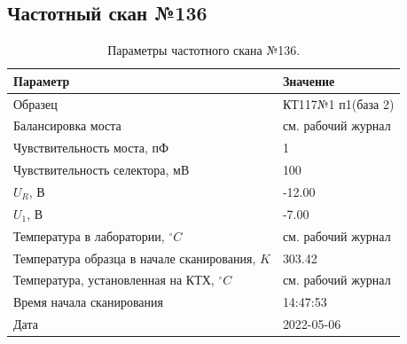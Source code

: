 \subsection{Частотный скан №136}
\begin{table}[!ht]
    \centering
    \caption{Параметры частотного скана №136.}
    \begin{tabular}{|l|l|}
        \hline
        Параметр                                       & Значение                  \\ \hline
        Образец                                        & КТ117№1 п1(база 2)        \\ \hline
        Балансировка моста                             & см. рабочий журнал        \\ \hline
        Чувствительность моста, пФ                     & 1                         \\ \hline
        Чувствительность селектора, мВ                 & 100                       \\ \hline
        $U_R$, В                                       & -12.00                    \\ \hline
        $U_1$, В                                       & -7.00                     \\ \hline
        Температура в лаборатории, $^\circ C$          & см. рабочий журнал        \\ \hline
        Температура образца в начале сканирования, $K$ & 303.42                    \\ \hline
        Температура, установленная на КТХ, $^\circ C$  & см. рабочий журнал        \\ \hline
        Время начала сканирования                      & 14:47:53                  \\ \hline
        Дата                                           & 2022-05-06                \\ \hline
    \end{tabular}
    \label{table:frequency_scan_136}
\end{table}

